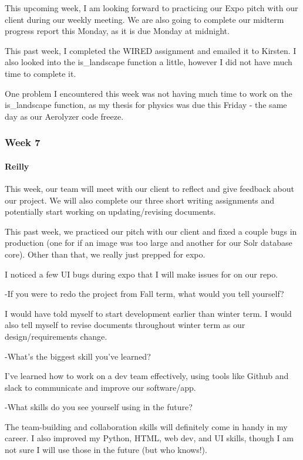 \documentclass[onecolumn, draftclsnofoot,10pt, compsoc]{IEEEtran}
\begin{document}
\begin{flushleft}
This upcoming week, I am looking forward to practicing our Expo pitch with our client during our weekly meeting. We are also going to complete our midterm progress report this Monday, as it is due Monday at midnight.
 
 
This past week, I completed the WIRED assignment and emailed it to Kirsten. I also looked into the is\_landscape function a little, however I did not have much time to complete it.
 
 
One problem I encountered this week was not having much time to work on the is\_landscape function, as my thesis for physics was due this Friday - the same day as our Aerolyzer code freeze.
 
\subsubsection{Week 7}
\paragraph{Reilly}
 
This week, our team will meet with our client to reflect and give feedback about our project. We will also complete our three short writing assignments and potentially start working on updating/revising documents.
 
 
This past week, we practiced our pitch with our client and fixed a couple bugs in production (one for if an image was too large and another for our Solr database core). Other than that, we really just prepped for expo.
 
 
I noticed a few UI bugs during expo that I will make issues for on our repo.
 
 
-If you were to redo the project from Fall term, what would you tell yourself?
 
I would have told myself to start development earlier than winter term. I would also tell myself to revise documents throughout winter term as our design/requirements change.
 
-What's the biggest skill you've learned?
 
I've learned how to work on a dev team effectively, using tools like Github and slack to communicate and improve our software/app.
 
-What skills do you see yourself using in the future?
 
The team-building and collaboration skills will definitely come in handy in my career. I also improved my Python, HTML, web dev, and UI skills, though I am not sure I will use those in the future (but who knows!).
 

\end{flushleft}
\end{document}
